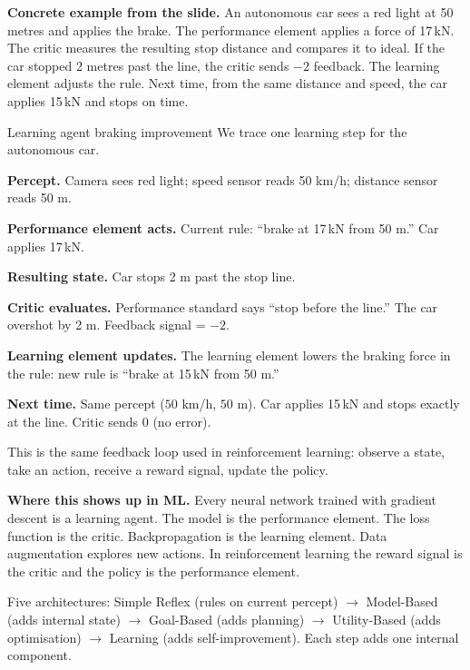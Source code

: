\documentclass[a4paper,11pt]{article}
\begin{document}
\textbf{Concrete example from the slide.}
An autonomous car sees a red light at 50 metres and applies the brake.
The performance element applies a force of 17\,kN.
The critic measures the resulting stop distance and compares it to ideal.
If the car stopped 2 metres past the line, the critic sends $-2$ feedback.
The learning element adjusts the rule.
Next time, from the same distance and speed, the car applies 15\,kN and stops on time.

\begin{worked}{Learning agent braking improvement}
We trace one learning step for the autonomous car.
\begin{steps}
  \item \textbf{Percept.} Camera sees red light; speed sensor reads 50 km/h;
        distance sensor reads 50 m.
  \item \textbf{Performance element acts.} Current rule: ``brake at 17\,kN
        from 50 m.'' Car applies 17\,kN.
  \item \textbf{Resulting state.} Car stops 2 m past the stop line.
  \item \textbf{Critic evaluates.} Performance standard says ``stop before the
        line.'' The car overshot by 2 m. Feedback signal = $-2$.
  \item \textbf{Learning element updates.} The learning element lowers the
        braking force in the rule: new rule is ``brake at 15\,kN from 50 m.''
  \item \textbf{Next time.} Same percept ($50$ km/h, $50$ m). Car applies 15\,kN
        and stops exactly at the line. Critic sends $0$ (no error).
\end{steps}
This is the same feedback loop used in reinforcement learning: observe a state,
take an action, receive a reward signal, update the policy.
\end{worked}

\textbf{Where this shows up in ML.}
Every neural network trained with gradient descent is a learning agent.
The model is the performance element. The loss function is the critic.
Backpropagation is the learning element. Data augmentation explores new
actions. In reinforcement learning the reward signal is the critic and the
policy is the performance element.

\begin{keytake}
Five architectures: Simple Reflex (rules on current percept) \(\to\) Model-Based
(adds internal state) \(\to\) Goal-Based (adds planning) \(\to\) Utility-Based
(adds optimisation) \(\to\) Learning (adds self-improvement). Each step adds
one internal component.
\end{keytake}
\end{document}
